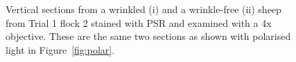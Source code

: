 %

\begin{figure}[p]
\centering
  \caption{Vertical sections from a wrinkled (i) and a wrinkle-free (ii)  sheep from Trial 1 flock 2 stained with PSR and examined with a 4x objective. These are the same two sections as shown with polarised light in Figure~\ref{fig:polar}. }
\vfill
  \label{fig:nopolar}
\end{figure}

%

